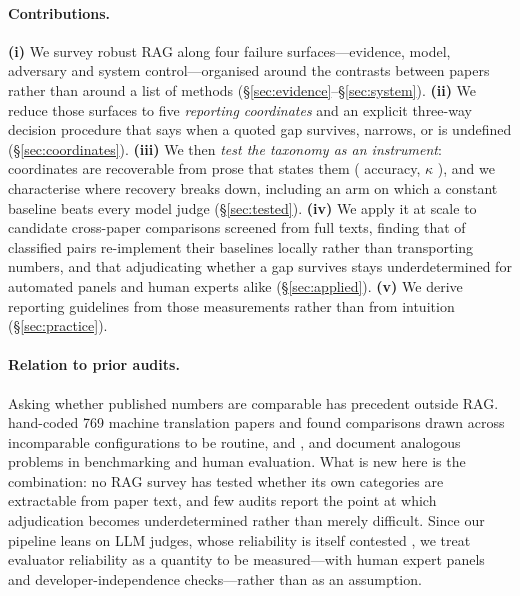 \documentclass[11pt]{article}
\begin{document}
\paragraph{Contributions.}
\textbf{(i)} We survey robust RAG along four failure surfaces---evidence, model, adversary and
system control---organised around the contrasts between papers rather than around a list of
methods (\S\ref{sec:evidence}--\S\ref{sec:system}).
\textbf{(ii)} We reduce those surfaces to five \emph{reporting coordinates} and an explicit
three-way decision procedure that says when a quoted gap survives, narrows, or is undefined
(\S\ref{sec:coordinates}).
\textbf{(iii)} We then \emph{test the taxonomy as an instrument}: coordinates are recoverable
from prose that states them (\InsFullCoord{} accuracy, $\kappa$ \InsFullK{}), and we
characterise where recovery breaks down, including an arm on which a constant baseline beats
every model judge (\S\ref{sec:tested}).
\textbf{(iv)} We apply it at scale to \FrameCandidates{} candidate cross-paper comparisons
screened from \FlowTexts{} full texts, finding that \ProvReimplemented{} of \ProvClassified{}
classified pairs re-implement their baselines locally rather than transporting numbers, and
that adjudicating whether a gap survives stays underdetermined for automated panels and human
experts alike (\S\ref{sec:applied}).
\textbf{(v)} We derive reporting guidelines from those measurements rather than from
intuition (\S\ref{sec:practice}).

\paragraph{Relation to prior audits.}
Asking whether published numbers are comparable has precedent outside RAG.
\citet{marie2021credibility} hand-coded 769 machine translation papers and found comparisons
drawn across incomparable configurations to be routine, and \citet{bowman2021benchmarking},
\citet{gehrmann2023cracked} and \citet{howcroft2020twenty,vanderlee2021human,clark2021human}
document analogous problems in benchmarking and human evaluation. What is new here is the
combination: no RAG survey has tested whether its own categories are extractable from paper
text, and few audits report the point at which adjudication becomes underdetermined rather
than merely difficult. Since our pipeline leans on LLM judges, whose reliability is itself
contested \citep{zheng2023judging,panickssery2024selfpreference,wang2024fairevaluators}, we
treat evaluator reliability as a quantity to be measured---with human expert panels and
developer-independence checks---rather than as an assumption.
\end{document}
